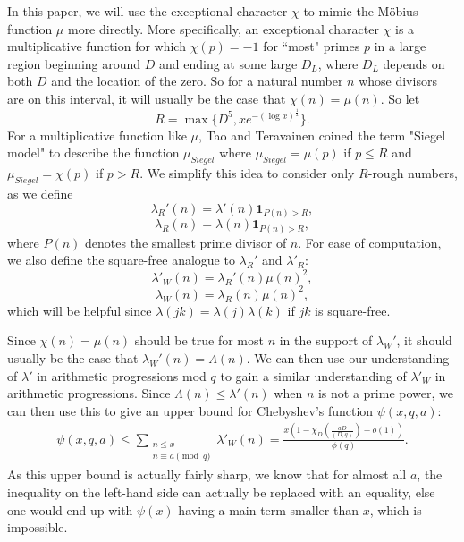 \documentclass{amsart}
\begin{document}
In this paper, we will use the exceptional character $\chi$ to mimic the M\"{o}bius function $\mu$ more directly.  More specifically, an exceptional character $\chi$ is a multiplicative function for which $\chi(p)=-1$ for ``most" primes $p$ in a large region beginning around $D$ and ending at some large $D_L$, where $D_L$ depends on both $D$ and the location of the zero.  So for a natural number $n$ whose divisors are on this interval, it will usually be the case that $\chi(n)=\mu(n)$.  So let
$$R=\max\{D^5,xe^{-(\log x)^{\frac 12}}\}.$$
For a multiplicative function like $\mu$, Tao and Teravainen \cite{TT} coined the term "Siegel model" to describe the function $\mu_{Siegel}$ where $\mu_{Siegel}=\mu(p)$ if $p\leq R$ and $\mu_{Siegel}=\chi(p)$ if $p>R$.  We simplify this idea to consider only $R$-rough numbers, as we define
$$\lambda_R'(n)=\lambda'(n)\textbf{1}_{P(n)>R},$$
$$\lambda_R(n)=\lambda(n)\textbf{1}_{P(n)>R},$$
where $P(n)$ denotes the smallest prime divisor of $n$.
For ease of computation, we also define the square-free analogue to $\lambda_R'$ and $\lambda'_R$:
$$\lambda'_W(n)=\lambda_R'(n)\mu(n)^2,$$
$$\lambda_W(n)=\lambda_R(n)\mu(n)^2,$$
which will be helpful since $\lambda(jk)=\lambda(j)\lambda(k)$ if $jk$ is square-free.

Since $\chi(n)=\mu(n)$ should be true for most $n$ in the support of $\lambda_W'$, it should usually be the case that $\lambda_W'(n)=\Lambda(n)$.  We can then use our understanding of $\lambda'$ in arithmetic progressions mod $q$ to gain a similar understanding of $\lambda'_W$ in arithmetic progressions.  Since $\Lambda(n)\leq \lambda'(n)$ when $n$ is not a prime power, we can then use this to give an upper bound for Chebyshev's function $\psi(x,q,a)$:
\begin{gather}\label{psiSW}\psi(x,q,a)\leq \sum_{\substack{n\leq x \\ n\equiv a\pmod q}}\lambda'_W(n)=\frac{x(1-\chi_D\left(\frac{aD}{(D,q)}\right)+o(1))}{\phi(q)}.\end{gather}
As this upper bound is actually fairly sharp, we know that for almost all $a$, the inequality on the left-hand side can actually be replaced with an equality, else one would end up with $\psi(x)$ having a main term smaller than $x$, which is impossible.
\end{document}
